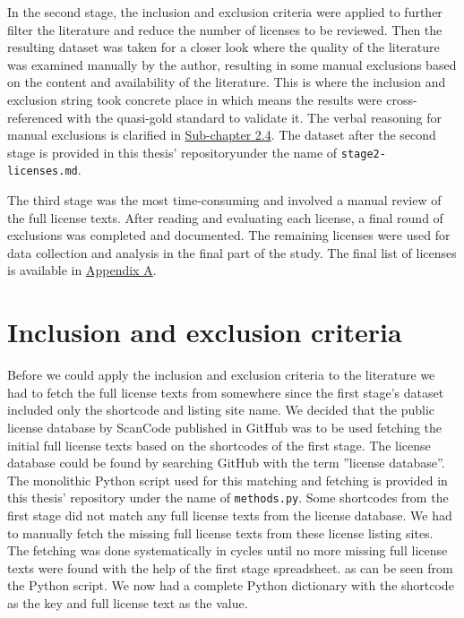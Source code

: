 In the second stage, the inclusion and exclusion criteria were applied to further filter the literature and reduce the number of licenses to be reviewed. Then the resulting dataset was taken for a closer look where the quality of the literature was examined manually by the author, resulting in some manual exclusions based on the content and availability of the literature. This is where the inclusion and exclusion string took concrete place in which means the results were cross-referenced with the quasi-gold standard to validate it. The verbal reasoning for manual exclusions is clarified in \hyperref[incexc-criteria]{Sub-chapter 2.4}. The dataset after the second stage is provided in this thesis' repository\footnotemark[1] under the name of \texttt{stage2-licenses.md}.

The third stage was the most time-consuming and involved a manual review of the full license texts. After reading and evaluating each license, a final round of exclusions was completed and documented. The remaining licenses were used for data collection and analysis in the final part of the study. The final list of licenses is available in \hyperref[appendix:a]{Appendix A}.

\section{Inclusion and exclusion criteria\label{incexc-criteria}}
Before we could apply the inclusion and exclusion criteria to the literature we had to fetch the full license texts from somewhere since the first stage's dataset included only the shortcode and listing site name. We decided that the public license database by ScanCode published in GitHub \citep{scancode} was to be used fetching the initial full license texts based on the shortcodes of the first stage. The license database could be found by searching GitHub with the term ''license database''. The monolithic Python script used for this matching and fetching is provided in this thesis' repository \footnotemark[1] under the name of \texttt{methods.py}. Some shortcodes from the first stage did not match any full license texts from the license database. We had to manually fetch the missing full license texts from these license listing sites. The fetching was done systematically in cycles until no more missing full license texts were found with the help of the first stage spreadsheet. as can be seen from the Python script. We now had a complete Python dictionary with the shortcode as the key and full license text as the value.

